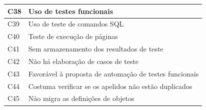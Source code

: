 \begin{longtable}{|M{1.3cm} | m{14.0cm}|}
C38            & Uso de testes funcionais                                                                                                                                                                                                                                          \\ \hline
C39            & Uso de teste de comandos SQL                                                                                                                                                                                                                                      \\ \hline
C40            & Teste de execução de páginas                                                                                                                                                                                                                                      \\ \hline
C41            & Sem armazenamento dos resultados de teste                                                                                                                                                                                                                         \\ \hline
C42            & Não há elaboração de casos de teste                                                                                                                                                                                                                               \\ \hline
C43            & Favorável à proposta de automação de testes funcionais                                                                                                                                                                                                            \\ \hline
C44            & Costuma verificar se os apelidos não estão duplicados                                                                                                                                                                                                             \\ \hline
C45            & Não migra as definições de objetos                                                                                                                                                                                                                                \\ \hline

\end{longtable}
